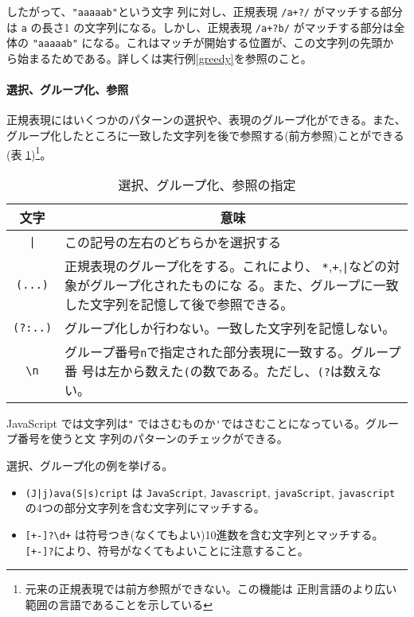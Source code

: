 したがって、\Verb+"aaaaab"+という文字
列に対し、正規表現 {\Verb-/a+?/-} がマッチする部分は \Verb+a+ の長さ1
の文字列になる。しかし、正規表現 {\Verb-/a+?b/-} がマッチする部分は全体の
\Verb+"aaaaab"+ になる。これはマッチが開始する位置が、この文字列の先頭か
ら始まるためである。詳しくは実行例\ref{greedy}を参照のこと。

\paragraph{選択、グループ化、参照}
正規表現にはいくつかのパターンの選択や、表現のグループ化ができる。また、
グループ化したところに一致した文字列を後で参照する(前方参照)ことができる(表
\ref{select})\footnote{元来の正規表現では前方参照ができない。この機能は
正則言語のより広い範囲の言語であることを示している}。
\begin{table}[ht]
\caption{選択、グループ化、参照の指定}\label{select}
\begin{center}
 \begin{tabular}{|c|m{}|}\hline
  文字&\multicolumn{1}{c|}{意味}\\\hline
\Verb+|+&この記号の左右のどちらかを選択する\\\hline
\Verb+(...)+&正規表現のグループ化をする。これにより、
      \Verb-*-,\Verb-+-,\Verb-|-などの対象がグループ化されたものにな
      る。また、グループに一致した文字列を記憶して後で参照できる。\\\hline
\Verb+(?:..)+&グループ化しか行わない。一致した文字列を記憶しない。\\\hline
\Verb+\n+&グループ番号\Verb+n+で指定された部分表現に一致する。グループ番
      号は左から数えた\Verb+(+の数である。ただし、\Verb+(?+は数えない。\\\hline
\end{tabular}
\end{center}
\end{table}

JavaScript では文字列は\Verb+"+%
ではさむものか\Verb+'+ではさむことになっている。グループ番号を使うと文
字列のパターンのチェックができる。
\begin{Exec}
選択、グループ化の例を挙げる。
\begin{itemize}\upshape
 \item \Verb-(J|j)ava(S|s)cript- は 
\Verb-JavaScript-, 
\Verb-Javascript-,
\Verb-javaScript-,
\Verb-javascript- の4つの部分文字列を含む文字列にマッチする。
 \item \Verb/[+-]?\d+/ は符号つき(なくてもよい)10進数を含む文字列とマッチする。
\Verb/[+-]?/により、符号がなくてもよいことに注意すること。
\end{itemize}
\end{Exec}
